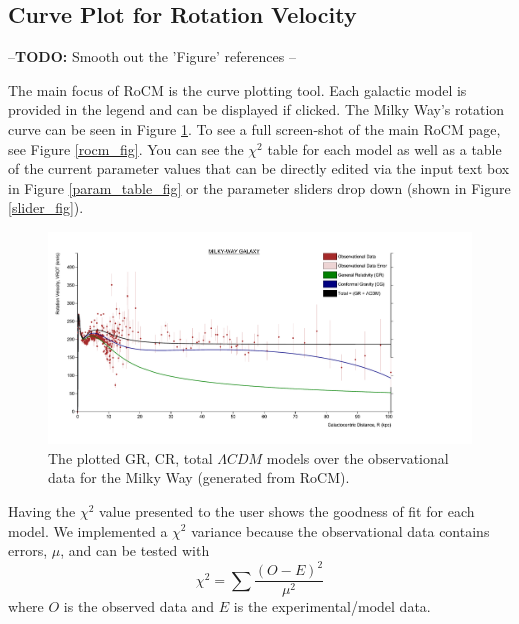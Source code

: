 \documentclass[conference]{IEEEtran-modified}
\begin{document}
\subsection{Curve Plot for Rotation Velocity}

--\textbf{TODO: } Smooth out the 'Figure' references --

The main focus of RoCM is the curve plotting tool. Each galactic model is provided in the legend and can be displayed if clicked. The Milky Way's rotation curve can be seen in Figure \ref{milkywayplot}. To see a full screen-shot of the main RoCM page, see Figure \ref{rocm_fig}. You can see the $\chi^2$ table for each model %
 as well as a table of the current parameter values that can be directly edited via the input text box in Figure \ref{param_table_fig} or the parameter sliders drop down (shown in Figure \ref{slider_fig}). 

\begin{figure}[h!]
\centering
\includegraphics[width=\textwidth]{MILKY-WAY}
\caption{The plotted GR, CR, total $\Lambda CDM$ models over the observational data for the Milky Way (generated from RoCM).}
\label{milkywayplot}
\end{figure}


Having the $\chi^2$ value presented to the user shows the goodness of fit for each model. We implemented a $\chi^2$ variance because the observational data contains errors, $\mu$, and can be tested with
\begin{equation}
\chi^2 = \sum \frac{(O-E)^2}{\mu^2}
\end{equation} 
where $O$ is the observed data and $E$ is the experimental/model data. 

%
\end{document}
